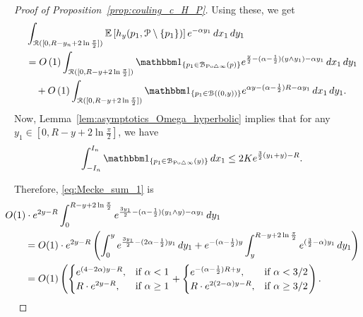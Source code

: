 \begin{proof}[Proof of Proposition~\ref{prop:couling_c_H_P}]
Using these, we get
\begin{align} 
	&\int_{\Rcal ([0, R - y_n + 2 \ln \frac{\pi}{2}])} \Exp{h_y(p_1, \Pcal \setminus \{p_1\})} 
    e^{-\alpha y_1} \, dx_1 \, dy_1 \notag \\
	&= \bigO{1} \int_{\Rcal ([0, R - y+ 2 \ln \frac{\pi}{2}])} \ind{p_1 \in \BallSym{p}} 
		e^{\frac{y}{2} - (\alpha - \frac{1}{2}) (y \wedge y_1) - \alpha y_1} \, dx_1 \, dy_1
		\label{eq:Mecke_sum_1}\\ 
	&\hspace{10pt}+ \bigO{1} \int_{\Rcal ([0, R - y + 2 \ln \frac{\pi}{2}])} 
    	\ind{p_1 \in \BallHyp{(0,y)}} 
    	e^{\alpha y - (\alpha - \frac{1}{2})R - \alpha y_1} \, dx_1 \, dy_1.\label{eq:Mecke_sum_2}
\end{align}
Now, Lemma~\ref{lem:asymptotics_Omega_hyperbolic} implies that 
for any $y_1 \in [0, R - y + 2 \ln \frac{\pi}{2}]$, we have 
\[ 
	\int_{-I_n}^{I_n} \ind{p_1 \in \BallSym{y}} \, dx_1 \leq 2 K e^{\frac{3}{2} (y_1 + y) - R}.
\]

Therefore, \eqref{eq:Mecke_sum_1} is 
\begin{align*}
	&\hspace{-20pt}O(1) \cdot e^{2 y - R} \int_{0}^{R - y + 2 \ln \frac{\pi}{2}} 
    	e^{\frac{3y_1}{2} - (\alpha - \frac{1}{2})(y_1 \wedge y) - \alpha y_1} \, dy_1 \\
 	&=  O(1) \cdot e^{2 y - R} \left( \int_{0}^{y} e^{\frac{3y_1}{2} - (2\alpha - \frac{1}{2})y_1} \, dy_1 
 		+ e^{-(\alpha-\frac{1}{2}) y}\int_{y}^{R - y + 2 \ln \frac{\pi}{2}} e^{(\frac{3}{2} - \alpha) y_1} \, dy_1 \right)\\
  	&= O(1) \left( 
	\begin{cases}
	e^{(4-2\alpha) y - R}, & \mbox{if $\alpha < 1$} \\
	R \cdot e^{2y - R}, & \mbox{if $\alpha \geq 1$}
	\end{cases}
	+
	\begin{cases}
	e^{-(\alpha - \frac{1}{2})R +y}, & \mbox{if $\alpha < 3/2$} \\
	R \cdot  e^{2(2-\alpha)y - R}, & \mbox{if $\alpha \geq 3/2$}
	\end{cases}\right).
\end{align*}


\end{proof}
